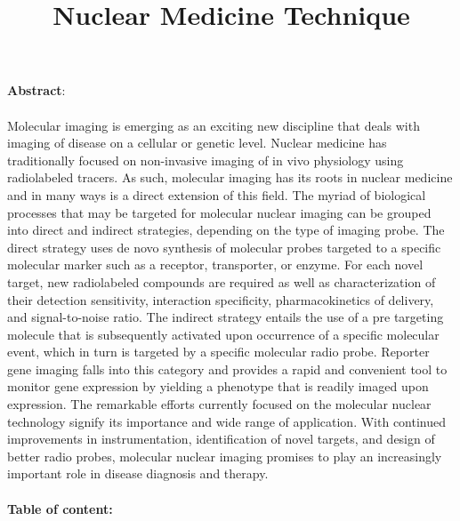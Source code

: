 \documentclass[12pt]{article}
\title{Nuclear Medicine Technique}
\date{}
\begin{document}
\maketitle
\noindent
\textbf{\large Abstract}:\\ \\ \large Molecular imaging is emerging as an exciting new discipline that deals with imaging of disease on a cellular or genetic level. Nuclear medicine has traditionally focused on non-invasive imaging of in vivo physiology using radiolabeled tracers. As such, molecular imaging has its roots in nuclear medicine and in many ways is a direct extension of this field. The myriad of biological processes that may be targeted for molecular nuclear imaging can be grouped into direct and indirect strategies, depending on the type of imaging probe. The direct strategy uses de novo synthesis of molecular probes targeted to a specific molecular marker such as a receptor, transporter, or enzyme. For each novel target, new radiolabeled compounds are required as well as characterization of their detection sensitivity, interaction specificity, pharmacokinetics of delivery, and signal-to-noise ratio. The indirect strategy entails the use of a pre targeting molecule that is subsequently activated upon occurrence of a specific molecular event, which in turn is targeted by a specific molecular radio probe. Reporter gene imaging falls into this category and provides a rapid and convenient tool to monitor gene expression by yielding a phenotype that is readily imaged upon expression. The remarkable efforts currently focused on the molecular nuclear technology signify its importance and wide range of application. With continued improvements in instrumentation, identification of novel targets, and design of better radio probes, molecular nuclear imaging promises to play an increasingly important role in disease diagnosis and therapy.
\noindent
\\ \\ \textbf{\large Table of content:}
\end{document}

